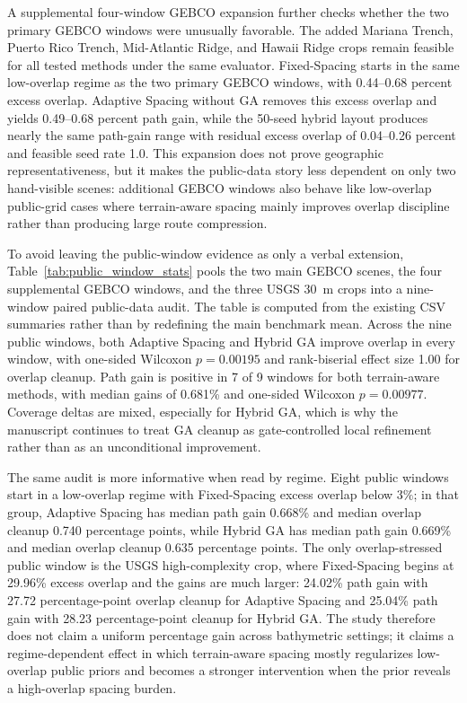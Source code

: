 \documentclass[jmse,article,submit,moreauthors]{Definitions/mdpi}
\begin{document}
A supplemental four-window GEBCO expansion further checks whether the two primary GEBCO windows were unusually favorable. The added Mariana Trench, Puerto Rico Trench, Mid-Atlantic Ridge, and Hawaii Ridge crops remain feasible for all tested methods under the same evaluator. Fixed-Spacing starts in the same low-overlap regime as the two primary GEBCO windows, with 0.44--0.68 percent excess overlap. Adaptive Spacing without GA removes this excess overlap and yields 0.49--0.68 percent path gain, while the 50-seed hybrid layout produces nearly the same path-gain range with residual excess overlap of 0.04--0.26 percent and feasible seed rate 1.0. This expansion does not prove geographic representativeness, but it makes the public-data story less dependent on only two hand-visible scenes: additional GEBCO windows also behave like low-overlap public-grid cases where terrain-aware spacing mainly improves overlap discipline rather than producing large route compression.

To avoid leaving the public-window evidence as only a verbal extension, Table~\ref{tab:public_window_stats} pools the two main GEBCO scenes, the four supplemental GEBCO windows, and the three USGS 30~m crops into a nine-window paired public-data audit. The table is computed from the existing CSV summaries rather than by redefining the main benchmark mean. Across the nine public windows, both Adaptive Spacing and Hybrid GA improve overlap in every window, with one-sided Wilcoxon \(p=0.00195\) and rank-biserial effect size 1.00 for overlap cleanup. Path gain is positive in 7 of 9 windows for both terrain-aware methods, with median gains of 0.681\% and one-sided Wilcoxon \(p=0.00977\). Coverage deltas are mixed, especially for Hybrid GA, which is why the manuscript continues to treat GA cleanup as gate-controlled local refinement rather than as an unconditional improvement.

The same audit is more informative when read by regime. Eight public windows start in a low-overlap regime with Fixed-Spacing excess overlap below \(3\%\); in that group, Adaptive Spacing has median path gain 0.668\% and median overlap cleanup 0.740 percentage points, while Hybrid GA has median path gain 0.669\% and median overlap cleanup 0.635 percentage points. The only overlap-stressed public window is the USGS high-complexity crop, where Fixed-Spacing begins at 29.96\% excess overlap and the gains are much larger: 24.02\% path gain with 27.72 percentage-point overlap cleanup for Adaptive Spacing and 25.04\% path gain with 28.23 percentage-point cleanup for Hybrid GA. The study therefore does not claim a uniform percentage gain across bathymetric settings; it claims a regime-dependent effect in which terrain-aware spacing mostly regularizes low-overlap public priors and becomes a stronger intervention when the prior reveals a high-overlap spacing burden.
\end{document}
